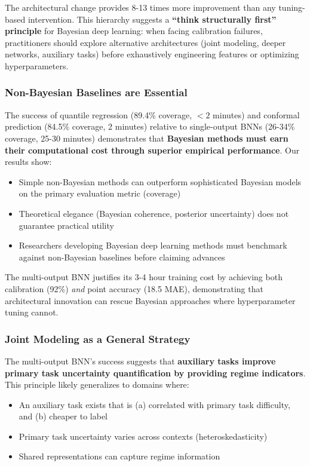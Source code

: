 The architectural change provides 8-13 times more improvement than any tuning-based intervention. This hierarchy suggests a \textbf{``think structurally first'' principle} for Bayesian deep learning: when facing calibration failures, practitioners should explore alternative architectures (joint modeling, deeper networks, auxiliary tasks) before exhaustively engineering features or optimizing hyperparameters.

\subsubsection{Non-Bayesian Baselines are Essential}

The success of quantile regression (89.4\% coverage, $<2$ minutes) and conformal prediction (84.5\% coverage, 2 minutes) relative to single-output BNNs (26-34\% coverage, 25-30 minutes) demonstrates that \textbf{Bayesian methods must earn their computational cost through superior empirical performance}. Our results show:

\begin{itemize}
    \item Simple non-Bayesian methods can outperform sophisticated Bayesian models on the primary evaluation metric (coverage)
    \item Theoretical elegance (Bayesian coherence, posterior uncertainty) does not guarantee practical utility
    \item Researchers developing Bayesian deep learning methods must benchmark against non-Bayesian baselines before claiming advances
\end{itemize}

The multi-output BNN justifies its 3-4 hour training cost by achieving both calibration (92\%) \textit{and} point accuracy (18.5 MAE), demonstrating that architectural innovation can rescue Bayesian approaches where hyperparameter tuning cannot.

\subsubsection{Joint Modeling as a General Strategy}

The multi-output BNN's success suggests that \textbf{auxiliary tasks improve primary task uncertainty quantification by providing regime indicators}. This principle likely generalizes to domains where:

\begin{itemize}
    \item An auxiliary task exists that is (a) correlated with primary task difficulty, and (b) cheaper to label
    \item Primary task uncertainty varies across contexts (heteroskedasticity)
    \item Shared representations can capture regime information
\end{itemize}

